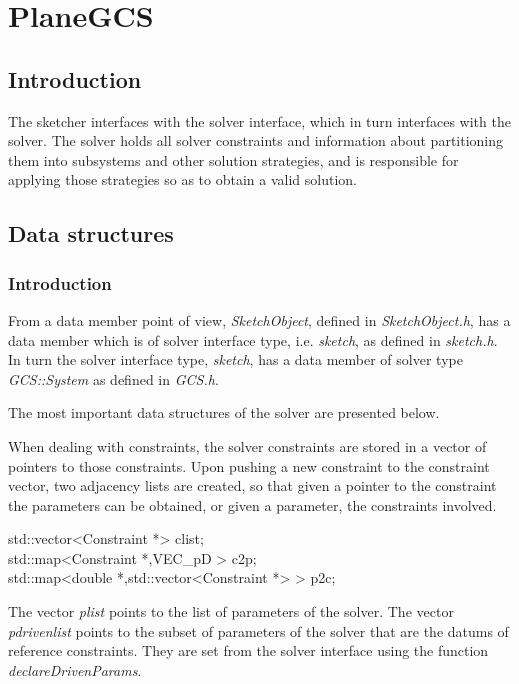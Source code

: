 \documentclass[12pt,twoside,a4paper]{book}
\newcommand{\SketchObject}{\emph{SketchObject}}
\begin{document}
    \chapter{PlaneGCS}

    \section{Introduction}

    The sketcher interfaces with the solver interface, which in turn interfaces with the solver. The solver holds all solver constraints and information about partitioning them into subsystems and other solution strategies, and is responsible for applying those strategies so as to obtain a valid solution.


    \section{Data structures}

    \subsection{Introduction}

    From a data member point of view, \SketchObject, defined in \emph{SketchObject.h}, has a data member which is of solver interface type, i.e. \emph{sketch}, as defined in \emph{sketch.h}. In turn the solver interface type, \emph{sketch}, has a data member of solver type \emph{GCS::System} as defined in \emph{GCS.h}.

    The most important data structures of the solver are presented below.

    When dealing with constraints, the solver constraints are stored in a vector of pointers to those constraints. Upon pushing a new constraint to the constraint vector, two adjacency lists are created, so that given a pointer to the constraint the parameters can be obtained, or given a parameter, the constraints involved.

    \begin{codequote}
    std::vector\textless{}Constraint *\textgreater{} clist;\\
    std::map\textless{}Constraint *,VEC\_pD \textgreater{} c2p;\\
    std::map\textless{}double *,std::vector\textless{}Constraint *\textgreater{} \textgreater{} p2c;
    \end{codequote}

    The vector \emph{plist} points to the list of parameters of the solver. The vector \emph{pdrivenlist} points to the subset of parameters of the solver that are the datums of reference constraints. They are set from the solver interface using the function \emph{declareDrivenParams}.
\end{document}
